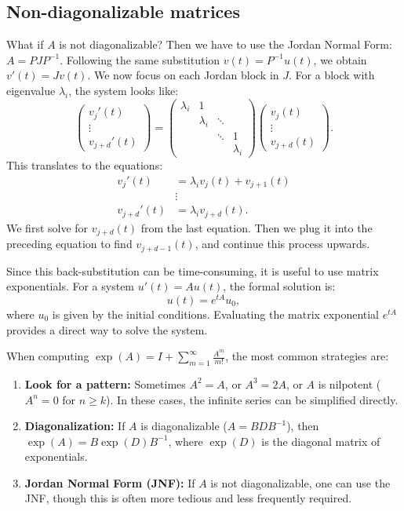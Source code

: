 \subsection{Non-diagonalizable matrices}
\label{sec:non_diagonalizable_matrices}
What if $A$ is not diagonalizable? Then we have to use the Jordan Normal Form: $A = P J P^{-1}$.
Following the same substitution $v(t) = P^{-1}u(t)$, we obtain $v'(t) = J v(t)$.
We now focus on each Jordan block in $J$. For a block with eigenvalue $\lambda_i$, the system looks like:
\[\begin{pmatrix} v_j'(t) \\ \vdots \\ v_{j+d}'(t) \end{pmatrix} = \begin{pmatrix} \lambda_i & 1 & & \\ & \lambda_i & \ddots & \\ & & \ddots & 1 \\ & & & \lambda_i \end{pmatrix} \begin{pmatrix} v_j(t) \\ \vdots \\ v_{j+d}(t) \end{pmatrix}.\]
This translates to the equations:
\begin{align*}
    v_j'(t) &= \lambda_i v_j(t) + v_{j+1}(t) \\
    &\vdots \\
    v_{j+d}'(t) &= \lambda_i v_{j+d}(t).
\end{align*}
We first solve for $v_{j+d}(t)$ from the last equation. Then we plug it into the preceding equation to find $v_{j+d-1}(t)$, and continue this process upwards.

Since this back-substitution can be time-consuming, it is useful to use matrix exponentials. For a system $u'(t) = A u(t)$, the formal solution is:
\[u(t) = e^{tA} u_0,\]
where $u_0$ is given by the initial conditions. Evaluating the matrix exponential $e^{tA}$ provides a direct way to solve the system.

\begin{remark}
When computing $\exp(A) = I + \sum_{m=1}^\infty \frac{A^m}{m!}$, the most common strategies are:
\begin{enumerate}[label=\textbf{(\alph*)}]
  \item \textbf{Look for a pattern:} Sometimes $A^2 = A$, or $A^3 = 2A$, or $A$ is nilpotent ($A^n = 0$ for $n \geq k$). In these cases, the infinite series can be simplified directly.
  \item \textbf{Diagonalization:} If $A$ is diagonalizable ($A = B D B^{-1}$), then $\exp(A) = B \exp(D) B^{-1}$, where $\exp(D)$ is the diagonal matrix of exponentials.
  \item \textbf{Jordan Normal Form (JNF):} If $A$ is not diagonalizable, one can use the JNF, though this is often more tedious and less frequently required.
\end{enumerate}
\end{remark}

